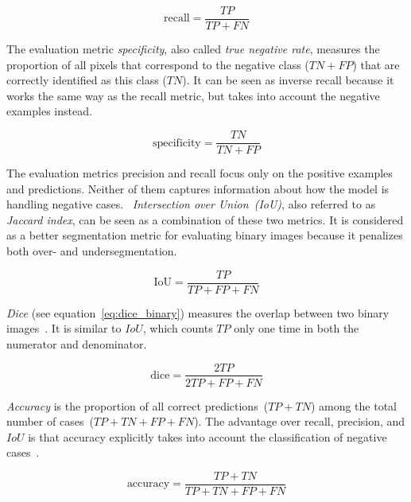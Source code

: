 \begin{equation}
\label{eq:recall}
\text{recall}=\frac{TP}{TP+FN}
\end{equation}

The evaluation metric \emph{specificity}, also called \emph{true negative rate}, measures the proportion of all pixels that correspond to the negative class ($TN+FP$) that are correctly identified as this class ($TN$).
It can be seen as inverse recall because it works the same way as the recall metric, but takes into account the negative examples instead.~\cite{powers2011eva_recall_precision}

\begin{equation}
\label{eq:specificity}
\text{specificity}=\frac{TN}{TN+FP}
\end{equation}

The evaluation metrics precision and recall focus only on the positive examples and predictions. Neither of them captures information about how the model is handling negative cases.~\cite{powers2011eva_recall_precision}
\emph{Intersection over Union~(IoU)}, also referred to as \emph{Jaccard index}, can be seen as a combination of these two metrics.
It is considered as a better segmentation metric for evaluating binary images because it penalizes both over- and undersegmentation.~\cite{Attia2017_surg_tool_cnn-rnn}

\begin{equation}
\label{eq:iou}
\text{IoU}=\frac{TP}{TP+FP+FN}
\end{equation}

\emph{Dice} (see equation~\ref{eq:dice_binary}) measures the overlap between two binary images~\cite{dice_eva2008babalola}. It is similar to $IoU$, which counts $TP$ only one time in both the numerator and denominator.

\begin{equation}
\label{eq:dice_binary}
\text{dice} = \frac{2 TP}{2 TP + FP + FN}
\end{equation}

\emph{Accuracy} is the proportion of all correct predictions~($TP+TN$) among the total number of cases~($TP+TN+FP+FN$).
The advantage over recall, precision, and $IoU$ is that accuracy explicitly takes into account the classification of negative cases~\cite{powers2011eva_recall_precision}.

\begin{equation}
\label{eq:accuracy}
\text{accuracy}=\frac{TP+TN}{TP+TN+FP+FN}
\end{equation}

